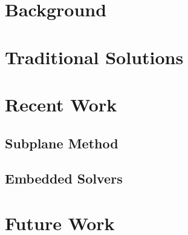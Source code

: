 \section{Background}


\section{Traditional Solutions}


\section{Recent Work}

\subsection{Subplane Method}


\subsection{Embedded Solvers}



\section{Future Work}